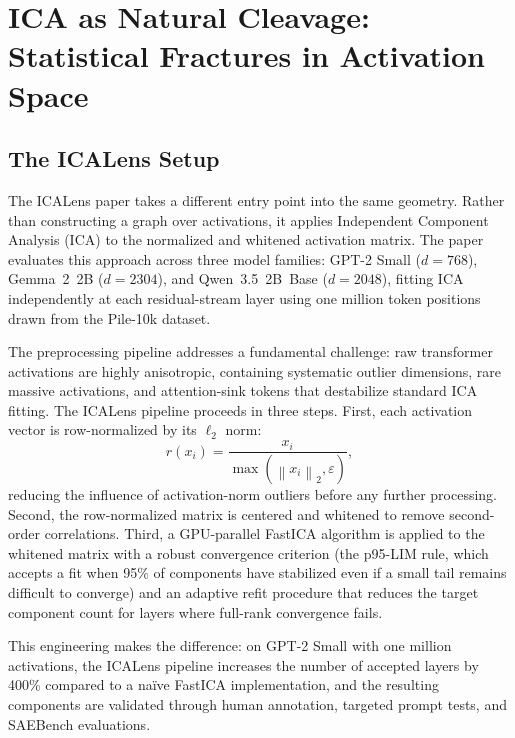 \documentclass[12pt, a4paper]{article}
\theoremstyle{plain}
\theoremstyle{definition}
\theoremstyle{remark}
\newcommand{\norm}[1]{\left\|#1\right\|}
\begin{document}
\section{ICA as Natural Cleavage: Statistical Fractures in Activation Space}

\subsection{The ICALens Setup}

The ICALens paper \cite{liu2026icalens} takes a different entry point into the
same geometry. Rather than constructing a graph over activations, it applies
Independent Component Analysis (ICA) \cite{hyvarinen2000ica, hyvarinen2001book}
to the normalized and whitened activation matrix. The paper evaluates this
approach across three model families: GPT-2 Small ($d = 768$), Gemma~2~2B
($d = 2304$), and Qwen~3.5~2B~Base ($d = 2048$), fitting ICA independently at
each residual-stream layer using one million token positions drawn from the
Pile-10k dataset.

The preprocessing pipeline addresses a fundamental challenge: raw transformer
activations are highly anisotropic, containing systematic outlier dimensions,
rare massive activations, and attention-sink tokens that destabilize standard
ICA fitting. The ICALens pipeline proceeds in three steps. First, each
activation vector is row-normalized by its $\ell_2$ norm:
\begin{equation}
  r(x_i) = \frac{x_i}{\max(\norm{x_i}_2, \varepsilon)},
\end{equation}
reducing the influence of activation-norm outliers before any further
processing. Second, the row-normalized matrix is centered and whitened to
remove second-order correlations. Third, a GPU-parallel FastICA algorithm is
applied to the whitened matrix with a robust convergence criterion (the
p95-LIM rule, which accepts a fit when 95\% of components have stabilized
even if a small tail remains difficult to converge) and an adaptive refit
procedure that reduces the target component count for layers where full-rank
convergence fails.

This engineering makes the difference: on GPT-2 Small with one million
activations, the ICALens pipeline increases the number of accepted layers by
400\% compared to a na\"{i}ve FastICA implementation, and the resulting
components are validated through human annotation, targeted prompt tests,
and SAEBench evaluations.
\end{document}
